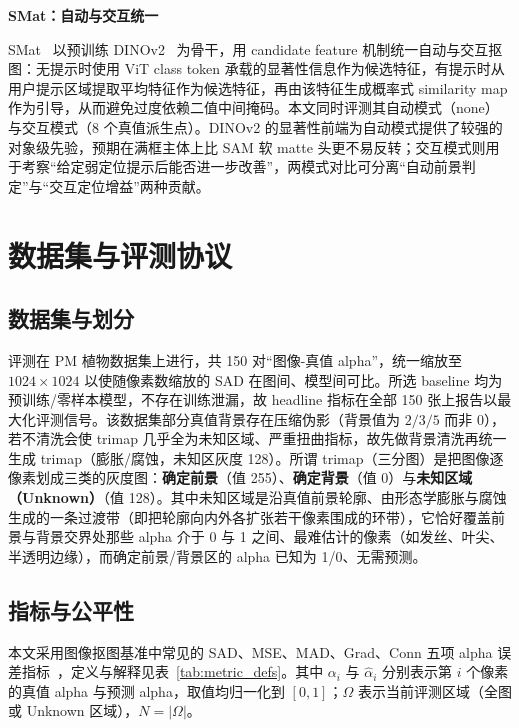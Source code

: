 \documentclass[supercite]{HustGraduPaper}
\begin{document}
	\textbf{SMat：自动与交互统一}
	
	SMat~\cite{smat} 以预训练 DINOv2~\cite{dinov2} 为骨干，用 candidate feature 机制统一自动与交互抠图：无提示时使用 ViT class token 承载的显著性信息作为候选特征，有提示时从用户提示区域提取平均特征作为候选特征，再由该特征生成概率式 similarity map 作为引导，从而避免过度依赖二值中间掩码。本文同时评测其自动模式（none）与交互模式（8 个真值派生点）。DINOv2 的显著性前端为自动模式提供了较强的对象级先验，预期在满框主体上比 SAM 软 matte 头更不易反转；交互模式则用于考察“给定弱定位提示后能否进一步改善”，两模式对比可分离“自动前景判定”与“交互定位增益”两种贡献。

	\section{数据集与评测协议}
	\subsection{数据集与划分}
	评测在 PM 植物数据集上进行，共 150 对“图像-真值 alpha”，统一缩放至 $1024\times1024$ 以使随像素数缩放的 SAD 在图间、模型间可比。所选 baseline 均为预训练/零样本模型，不存在训练泄漏，故 headline 指标在全部 150 张上报告以最大化评测信号。该数据集部分真值背景存在压缩伪影（背景值为 $2/3/5$ 而非 $0$），若不清洗会使 trimap 几乎全为未知区域、严重扭曲指标，故先做背景清洗再统一生成 trimap（膨胀/腐蚀，未知区灰度 128）。所谓 trimap（三分图）是把图像逐像素划成三类的灰度图：\textbf{确定前景}（值 255）、\textbf{确定背景}（值 0）与\textbf{未知区域（Unknown）}（值 128）。其中未知区域是沿真值前景轮廓、由形态学膨胀与腐蚀生成的一条过渡带（即把轮廓向内外各扩张若干像素围成的环带），它恰好覆盖前景与背景交界处那些 alpha 介于 0 与 1 之间、最难估计的像素（如发丝、叶尖、半透明边缘），而确定前景/背景区的 alpha 已知为 1/0、无需预测。

	\subsection{指标与公平性}
	本文采用图像抠图基准中常见的 SAD、MSE、MAD、Grad、Conn 五项 alpha 误差指标~\cite{metrics}，定义与解释见表~\ref{tab:metric_defs}。其中 $\alpha_i$ 与 $\hat{\alpha}_i$ 分别表示第 $i$ 个像素的真值 alpha 与预测 alpha，取值均归一化到 $[0,1]$；$\Omega$ 表示当前评测区域（全图或 Unknown 区域），$N=|\Omega|$。
\end{document}
